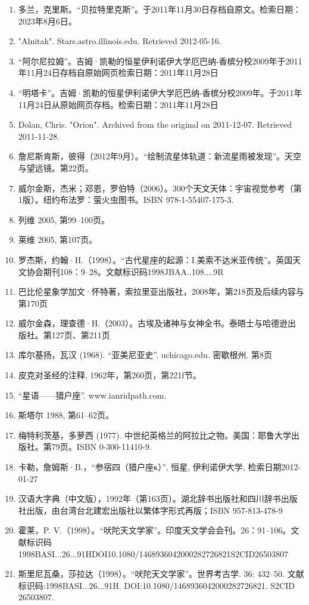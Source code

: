 \begin{enumerate}
\item 多兰，克里斯。“贝拉特里克斯”。于2011年11月30日存档自原文。检索日期：2023年8月6日。
\item "Alnitak". Stars.astro.illinois.edu. Retrieved 2012-05-16.
\item “阿尔尼拉姆”。吉姆·凯勒的恒星伊利诺伊大学厄巴纳-香槟分校2009年于2011年11月24日存档自原始网页检索日期：2011年11月28日
\item “明塔卡”。吉姆·凯勒的恒星伊利诺伊大学厄巴纳-香槟分校2009年。于2011年11月24日从原始网页存档。检索日期：2011年11月28日
\item Dolan, Chris. "Orion". Archived from the original on 2011-12-07. Retrieved 2011-11-28.
\item 詹尼斯肯斯，彼得（2012年9月）。“绘制流星体轨道：新流星雨被发现”。天空与望远镜。第22页。
\item 威尔金斯，杰米；邓恩，罗伯特（2006）。300个天文天体：宇宙视觉参考（第1版）。纽约布法罗：萤火虫图书。ISBN 978-1-55407-175-3.
\item 列维 2005, 第99–100页。
\item 莱维 2005, 第107页。
\item 罗杰斯，约翰·H.（1998）。“古代星座的起源：I.美索不达米亚传统”。英国天文协会期刊108：9–28。文献标识码1998JBAA..108....9R
\item 巴比伦星象学加文·怀特著，索拉里亚出版社，2008年，第218页及后续内容与第170页
\item 威尔金森，理查德·H.（2003）。古埃及诸神与女神全书。泰晤士与哈德逊出版社。第127页、第211页
\item 库尔基扬，瓦汉 (1968). “亚美尼亚史”. uchicago.edu. 密歇根州. 第8页
\item 皮克对圣经的注释, 1962年，第260页，第221f节。
\item “星语——猎户座”. www.ianridpath.com.
\item 斯塔尔 1988, 第61–62页。
\item 梅特利茨基，多萝西 (1977). 中世纪英格兰的阿拉比之物。美国：耶鲁大学出版社。第79页。ISBN 0-300-11410-9.
\item 卡勒，詹姆斯·B.，“参宿四（猎户座κ）”, 恒星, 伊利诺伊大学, 检索日期2012-01-27
\item 汉语大字典（中文版），1992年（第163页）。湖北辞书出版社和四川辞书出版社出版，由台湾台北建宏出版社以繁体字形式再版；ISBN 957-813-478-9
\item 霍莱，P. V.（1998）。“吠陀天文学家”。印度天文学会会刊。26：91–106。文献标识码1998BASI...26...91HDOI10.1080/1468936042000282726821S2CID26503807
\item 斯里尼瓦桑，莎拉达（1998）。“吠陀天文学家”。世界考古学. 36: 432–50. 文献标识码:1998BASI...26...91H. DOI:10.1080/1468936042000282726821. S2CID 26503807.

\end{enumerate}

